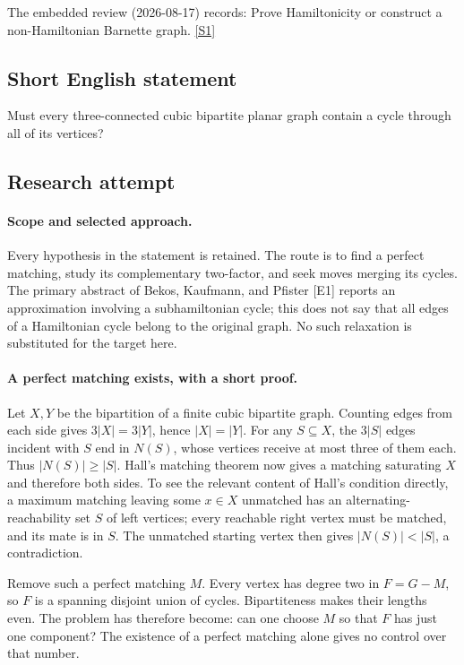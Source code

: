 \documentclass[11pt,a4paper]{article}
\newcommand{\sref}[2]{\hyperlink{source:#1:#2}{[S#2]}}
\begin{document}
The embedded review (2026-08-17) records: Prove Hamiltonicity or construct a non-Hamiltonian Barnette graph. \sref{statement}{1}

\subsection{Short English statement}

Must every three-connected cubic bipartite planar graph contain a cycle through all of its vertices?

\subsection{Research attempt}

\paragraph{Scope and selected approach.}
Every hypothesis in the statement is retained. The route is to find a
perfect matching, study its complementary two-factor, and seek moves
merging its cycles. The primary abstract of Bekos, Kaufmann, and Pfister
[E1] reports an approximation involving a subhamiltonian cycle; this
does not say that all edges of a Hamiltonian cycle belong to the
original graph. No such relaxation is substituted for the target here.

\paragraph{A perfect matching exists, with a short proof.}
Let $X,Y$ be the bipartition of a finite cubic bipartite graph. Counting
edges from each side gives $3|X|=3|Y|$, hence $|X|=|Y|$. For any
$S\subseteq X$, the $3|S|$ edges incident with $S$ end in $N(S)$,
whose vertices receive at most three of them each. Thus
$|N(S)|\ge|S|$. Hall's matching theorem now gives a matching saturating
$X$ and therefore both sides. To see the relevant content of Hall's
condition directly, a maximum matching leaving some $x\in X$
unmatched has an alternating-reachability set $S$ of left vertices;
every reachable right vertex must be matched, and its mate is in $S$.
The unmatched starting vertex then gives $|N(S)|<|S|$, a contradiction.

Remove such a perfect matching $M$. Every vertex has degree two in
$F=G-M$, so $F$ is a spanning disjoint union of cycles. Bipartiteness
makes their lengths even. The problem has therefore become: can one
choose $M$ so that $F$ has just one component? The existence of a
perfect matching alone gives no control over that number.
\end{document}

